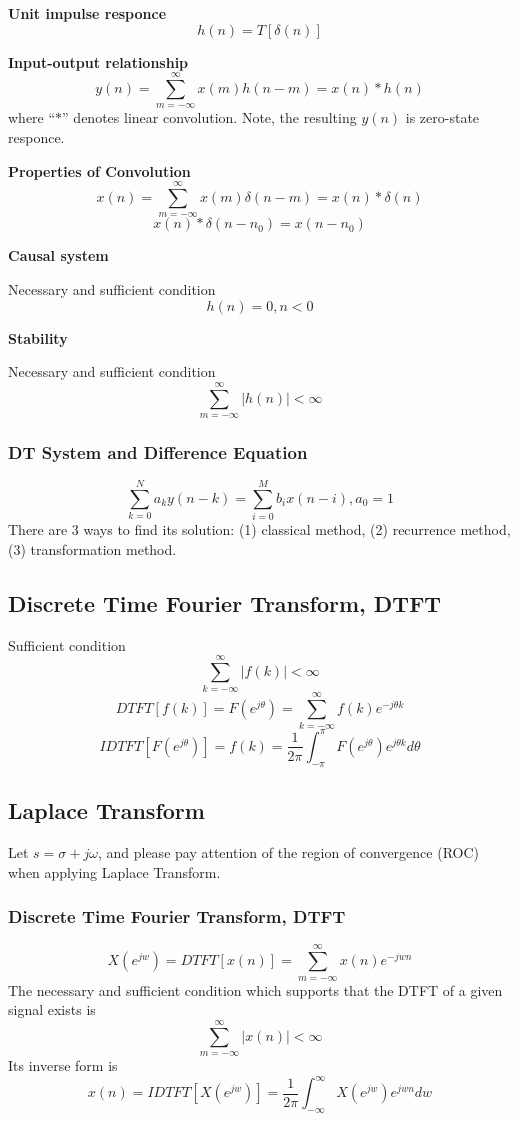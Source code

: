 {\bf Unit impulse responce}
\[ h(n) = T[\delta(n)] \]

{\bf Input-output relationship}
\[ y(n) = \sum_{m=-\infty}^\infty x(m)h(n-m) = x(n) * h(n)\]
where ``$*$'' denotes linear convolution. Note, the resulting $y(n)$
is zero-state responce.

{\bf Properties of Convolution}
\[ x(n) = \sum_{m=-\infty}^\infty x(m)\delta(n-m) = x(n) * \delta(n)\]
\[ x(n) * \delta(n-n_0) = x(n-n_0)\]

{\bf Causal system}

Necessary and sufficient condition
\[ h(n) = 0, n < 0\]

{\bf Stability}

Necessary and sufficient condition
\[ \sum_{m=-\infty}^\infty |h(n)| < \infty\]

\subsubsection{DT System and Difference Equation}

\[ \sum_{k=0}^N a_k y(n-k) = \sum_{i=0}^M b_i x(n-i), a_0 = 1\]
There are 3 ways to find its solution: (1) classical method,
(2) recurrence method, (3) transformation method.

\subsection{Discrete Time Fourier Transform, DTFT}

 Sufficient condition 
 \[ \sum_{k=-\infty}^\infty |f(k)| < \infty \]
 \[ DTFT[f(k)] = F(e^{j\theta}) = \sum_{k=-\infty}^\infty f(k)e^{-j\theta k} \]
 \[ IDTFT[F(e^{j\theta})] = f(k) = \frac{1}{2\pi} \int_{-\pi}^\pi F(e^{j\theta})e^{j\theta k} d\theta\]

 \subsection{Laplace Transform}
 Let $s = \sigma + j\omega$, and please pay attention of the region
 of convergence (ROC) when applying Laplace Transform.

 \subsubsection{Discrete Time Fourier Transform, DTFT}
\[ X(e^{jw}) = DTFT[x(n)] = \sum_{m=-\infty}^\infty x(n) e^{-jwn} \]
The necessary and sufficient condition which supports that the DTFT of
a given signal exists is
\[ \sum_{m=-\infty}^\infty |x(n)| < \infty\]
Its inverse form is
\[ x(n) = IDTFT[X(e^{jw})] = \frac{1}{2\pi} \int_{-\infty}^\infty X(e^{jw})e^{jwn} dw\]

